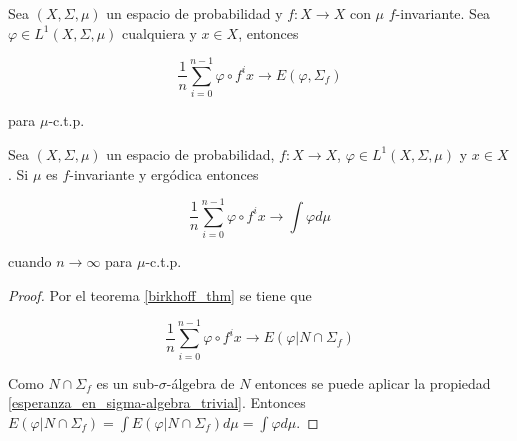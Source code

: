 \begin{teorema}\label{birkhoff_thm}
	Sea $(X,\Sigma,\mu)$ un espacio de probabilidad y $f: X \rightarrow X$ con $\mu$ $f$-invariante. Sea $\varphi \in L^1(X,\Sigma,\mu)$ cualquiera y $x \in X$, entonces
	
	\begin{equation}
		\frac{1}{n} \sum_{i=0}^{n-1} \varphi \circ f^i x \rightarrow E(\varphi,\Sigma_f)
	\end{equation}
	
	para $\mu$-c.t.p.
	
\end{teorema}

\begin{corolario}\label{birkhoff_corolario}
	Sea $(X,\Sigma,\mu)$ un espacio de probabilidad, $f: X \rightarrow X$, $\varphi \in L^1(X,\Sigma,\mu)$ y $x \in X$. Si $\mu$ es $f$-invariante y ergódica entonces
	
	\begin{equation}
		\frac{1}{n} \sum_{i=0}^{n-1} \varphi \circ f^i x \rightarrow \int \varphi d\mu
	\end{equation}
	
	cuando $n \rightarrow \infty$ para $\mu$-c.t.p.
\end{corolario}

\begin{proof}
	Por el teorema \ref{birkhoff_thm} se tiene que
	
	\begin{equation}
		\frac{1}{n} \sum_{i=0}^{n-1} \varphi \circ f^i x \rightarrow E(\varphi|N \cap \Sigma_f)
	\end{equation}
	
	Como $N \cap \Sigma_f$ es un sub-$\sigma$-álgebra de $N$ entonces se puede aplicar la propiedad \ref{esperanza_en_sigma-algebra_trivial}. Entonces $E(\varphi|N \cap \Sigma_f) = \int E(\varphi|N \cap \Sigma_f) d\mu = \int \varphi d\mu$. 
\end{proof}